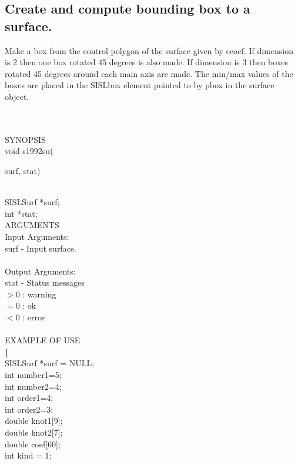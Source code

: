 \subsection{Create and compute bounding box to a surface.}
\begin{minipg7}
		Make a box from the control polygon of the surface given by
              	ecoef. If dimension is 2 then one
	       	box rotated 45 degrees is also made. If dimension
	       	is 3 then boxes rotated 45 degrees around each
	       	main axis are made. The min/max values of the boxes are placed in the SISLbox element pointed to by pbox in the surface object.
\end{minipg7} \\ \\
SYNOPSIS\\
	\>void s1992su(\begin{minipg3}
		{\fov surf}, {\fov stat})
		\end{minipg3}\\[0.3ex]
		\>\>	SISLSurf 	\>	*{\fov surf};\\
		\>\>	int 	\>	*{\fov stat};\\
\newpagetabs
ARGUMENTS\\
	\>Input Arguments:\\
	\>\>	{\fov surf}	\> - \>	Input surface.\\
\\
	\>Output Arguments:\\
	\>\>	{\fov stat}	\> - \>	Status messages\\
		\>\>\>\>\>		$> 0$	: warning\\
		\>\>\>\>\>		$= 0$	: ok\\
		\>\>\>\>\>		$< 0$	: error\\
\\
EXAMPLE OF USE\\
		\>	\{ \\
  		\>\>	SISLSurf    \>	*{\fov surf} = NULL;\\
  		\>\>	int    \>	{\fov number}1=5;\\
  		\>\>	int    \>	{\fov number}2=4;\\
  		\>\>	int    \>	{\fov order}1=4;\\
  		\>\>	int    \>	{\fov order}2=3;\\
  		\>\>	double \>	{\fov knot1[9]};\\
  		\>\>	double \>	{\fov knot2[7]};\\
  		\>\>	double \>	{\fov coef[60]};\\
  		\>\>	int    \>	{\fov kind} = 1;\\
